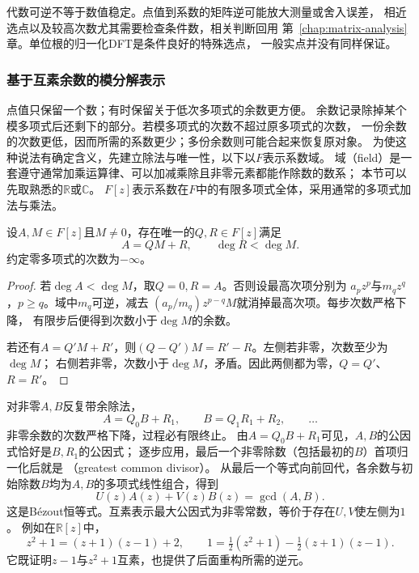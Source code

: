 代数可逆不等于数值稳定。点值到系数的矩阵逆可能放大测量或舍入误差，
相近选点以及较高次数尤其需要检查条件数，相关判断回用
第~\ref{chap:matrix-analysis}章。单位根的归一化DFT是条件良好的特殊选点，
一般实点并没有同样保证。

\subsubsection{基于互素余数的模分解表示}

点值只保留一个数；有时保留关于低次多项式的余数更方便。
余数记录除掉某个模多项式后还剩下的部分。若模多项式的次数不超过原多项式的次数，
一份余数的次数更低，因而所需的系数更少；多份余数则可能合起来恢复原对象。
为使这种说法有确定含义，先建立除法与唯一性，以下以$F$表示系数域。
域（field）是一套遵守通常加乘运算律、可以加减乘除且非零元素都能作除数的数系；
本节可以先取熟悉的$\mathbb R$或$\mathbb C$。
$F[z]$表示系数在$F$中的有限多项式全体，采用通常的多项式加法与乘法。
\begin{theorem}[多项式带余除法]
  \label{thm:signal-analysis-polynomial-division}
  设$A,M\in F[z]$且$M\neq0$，存在唯一的$Q,R\in F[z]$满足
  \[
    A=QM+R,\qquad\deg R<\deg M.
  \]
  约定零多项式的次数为$-\infty$。
\end{theorem}
\begin{proof}
  若$\deg A<\deg M$，取$Q=0,R=A$。否则设最高次项分别为
  $a_pz^p$与$m_qz^q$，$p\geq q$。域中$m_q$可逆，减去
  $(a_p/m_q)z^{p-q}M$就消掉最高次项。每步次数严格下降，
  有限步后便得到次数小于$\deg M$的余数。

  若还有$A=Q'M+R'$，则$(Q-Q')M=R'-R$。左侧若非零，次数至少为$\deg M$；
  右侧若非零，次数小于$\deg M$，矛盾。因此两侧都为零，$Q=Q'$、$R=R'$。
\end{proof}

对非零$A,B$反复带余除法，
\[
  A=Q_0B+R_1,\qquad B=Q_1R_1+R_2,\qquad\ldots
\]
非零余数的次数严格下降，过程必有限终止。
由$A=Q_0B+R_1$可见，$A,B$的公因式恰好是$B,R_1$的公因式；
逐步应用，最后一个非零除数（包括最初的$B$）首项归一化后就是
（greatest common divisor）。
从最后一个等式向前回代，各余数与初始除数$B$均为$A,B$的多项式线性组合，得到
\begin{equation}
  U(z)A(z)+V(z)B(z)=\gcd(A,B).
  \label{eq:signal-analysis-polynomial-bezout}
\end{equation}
这是Bézout恒等式。互素表示最大公因式为非零常数，等价于存在$U,V$使左侧为$1$。
例如在$\mathbb R[z]$中，
\[
  z^2+1=(z+1)(z-1)+2,\qquad
  1=\tfrac12(z^2+1)-\tfrac12(z+1)(z-1).
\]
它既证明$z-1$与$z^2+1$互素，也提供了后面重构所需的逆元。

